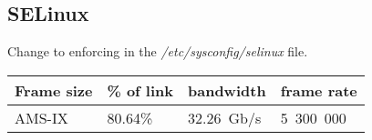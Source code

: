 
\subsection{SELinux}
Change to enforcing in the {\it{/etc/sysconfig/selinux}} file.

\begin{tabular}{ | l | l | l | l | }
\hline
Frame size & \% of link & bandwidth & frame rate \\
\hline
AMS-IX & 80.64\% & 32.26~Gb/s & 5~300~000 \\
\hline
\end{tabular}
